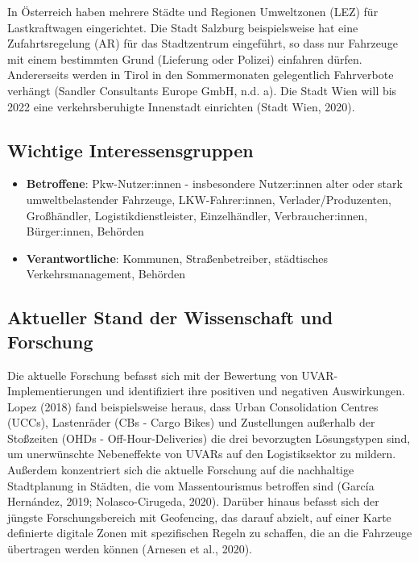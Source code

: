 \documentclass[
]{book}
\providecommand{\tightlist}{%
  \setlength{\itemsep}{0pt}\setlength{\parskip}{0pt}}
\begin{document}
In Österreich haben mehrere Städte und Regionen Umweltzonen (LEZ) für Lastkraftwagen eingerichtet. Die Stadt Salzburg beispielsweise hat eine Zufahrtsregelung (AR) für das Stadtzentrum eingeführt, so dass nur Fahrzeuge mit einem bestimmten Grund (Lieferung oder Polizei) einfahren dürfen. Andererseits werden in Tirol in den Sommermonaten gelegentlich Fahrverbote verhängt (Sandler Consultants Europe GmbH, n.d. a). Die Stadt Wien will bis 2022 eine verkehrsberuhigte Innenstadt einrichten (Stadt Wien, 2020).

\hypertarget{wichtige-interessensgruppen-17}{%
\subsection*{Wichtige Interessensgruppen}\label{wichtige-interessensgruppen-17}}

\begin{itemize}
\tightlist
\item
  \textbf{Betroffene}: Pkw-Nutzer:innen - insbesondere Nutzer:innen alter oder stark umweltbelastender Fahrzeuge, LKW-Fahrer:innen, Verlader/Produzenten, Großhändler, Logistikdienstleister, Einzelhändler, Verbraucher:innen, Bürger:innen, Behörden
\item
  \textbf{Verantwortliche}: Kommunen, Straßenbetreiber, städtisches Verkehrsmanagement, Behörden
\end{itemize}

\hypertarget{aktueller-stand-der-wissenschaft-und-forschung-17}{%
\subsection*{Aktueller Stand der Wissenschaft und Forschung}\label{aktueller-stand-der-wissenschaft-und-forschung-17}}

Die aktuelle Forschung befasst sich mit der Bewertung von UVAR-Implementierungen und identifiziert ihre positiven und negativen Auswirkungen. Lopez (2018) fand beispielsweise heraus, dass Urban Consolidation Centres (UCCs), Lastenräder (CBs - Cargo Bikes) und Zustellungen außerhalb der Stoßzeiten (OHDs - Off-Hour-Deliveries) die drei bevorzugten Lösungstypen sind, um unerwünschte Nebeneffekte von UVARs auf den Logistiksektor zu mildern. Außerdem konzentriert sich die aktuelle Forschung auf die nachhaltige Stadtplanung in Städten, die vom Massentourismus betroffen sind (García Hernández, 2019; Nolasco-Cirugeda, 2020). Darüber hinaus befasst sich der jüngste Forschungsbereich mit Geofencing, das darauf abzielt, auf einer Karte definierte digitale Zonen mit spezifischen Regeln zu schaffen, die an die Fahrzeuge übertragen werden können (Arnesen et al., 2020).
\end{document}
